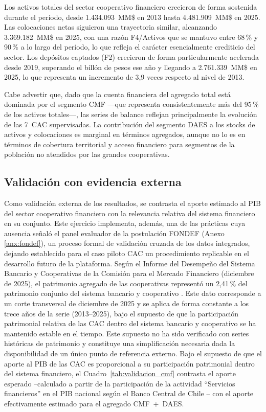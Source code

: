 Los activos totales del sector cooperativo financiero crecieron
de forma sostenida durante el período, desde 1.434.093~MM\$ en
2013 hasta 4.481.909~MM\$ en 2025. Las colocaciones netas
siguieron una trayectoria similar, alcanzando 3.369.182~MM\$ en
2025, con una razón F4/Activos que se mantuvo entre 68\,\% y
90\,\% a lo largo del período, lo que refleja el carácter
esencialmente crediticio del sector. Los depósitos captados
(F2) crecieron de forma particularmente acelerada desde 2019,
superando el billón de pesos ese año y llegando a 2.761.339~MM\$
en 2025, lo que representa un incremento de 3,9 veces respecto
al nivel de 2013.

Cabe advertir que, dado que la cuenta financiera del agregado
total está dominada por el segmento CMF —que representa
consistentemente más del 95\,\% de los activos totales—,
las series de balance reflejan principalmente la evolución
de las 7~CAC supervisadas. La contribución del segmento DAES
a los stocks de activos y colocaciones es marginal en términos
agregados, aunque no lo es en términos de cobertura territorial
y acceso financiero para segmentos de la población no atendidos
por las grandes cooperativas.

\subsection{Validación con evidencia externa}
\label{subsec:validacion-cmf}

Como validación externa de los resultados, se contrasta el aporte estimado
al PIB del sector cooperativo financiero con la relevancia relativa del
sistema financiero en su conjunto. Este ejercicio implementa, además, una de las prácticas cuya ausencia señaló el panel evaluador de la postulación FONDEF (Anexo \ref{anx:fondef}), un proceso formal de validación cruzada de los datos integrados, dejando establecido para el caso piloto CAC un procedimiento replicable en el desarrollo futuro de la plataforma. Según el Informe del Desempeño del
Sistema Bancario y Cooperativas de la Comisión para el Mercado Financiero
(diciembre de 2025), el patrimonio agregado de las cooperativas
representó un 2,41\,\% del patrimonio conjunto del sistema bancario y
cooperativo \cite{comision_para_el_mercado_financiero_informe_2025}. Este dato corresponde a un corte transversal de diciembre de 2025 y se aplica de forma
constante a los trece años de la serie (2013--2025), bajo el supuesto de que la participación
patrimonial relativa de las CAC dentro del sistema bancario y cooperativo se ha mantenido
estable en el tiempo. Este supuesto no ha sido verificado con series históricas de patrimonio
y constituye una simplificación necesaria dada la disponibilidad de un único punto de
referencia externo. Bajo
el supuesto de que el aporte al PIB de las CAC es proporcional a su
participación patrimonial dentro del sistema financiero, el
Cuadro~\ref{tab:validacion_cmf} contrasta el aporte esperado --calculado
a partir de la participación de la actividad ``Servicios financieros''
en el PIB nacional según el Banco Central de Chile
\cite{banco_central_de_chile_producto_2026}-- con el aporte efectivamente estimado
para el agregado CMF~+~DAES.

